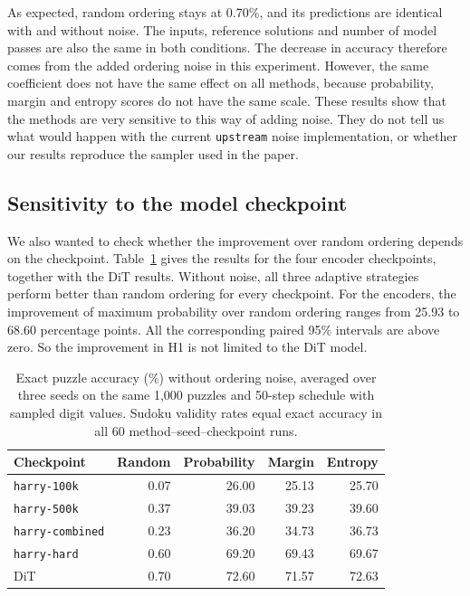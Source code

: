 \documentclass{article}
\begin{document}
As expected, random ordering stays at 0.70\%, and its predictions are
identical with and without noise. The inputs, reference solutions and number
of model passes are also the same in both conditions. The decrease in
accuracy therefore comes from the added ordering noise in this experiment.
However, the same coefficient does not have the same effect on all methods,
because probability, margin and entropy scores do not have the same scale.
These results show that the methods are very sensitive to this way of adding
noise. They do not tell us what would happen with the current
\texttt{upstream} noise implementation, or whether our results reproduce the
sampler used in the paper.

\subsection{Sensitivity to the model checkpoint}
We also wanted to check whether the improvement over random ordering depends
on the checkpoint. Table~\ref{tab:checkpoint-results} gives the results for
the four encoder checkpoints, together with the DiT results. Without noise,
all three adaptive strategies perform better than random ordering for every
checkpoint. For the encoders, the improvement of maximum probability over
random ordering ranges from 25.93 to 68.60 percentage points. All the
corresponding paired 95\% intervals are above zero. So the improvement in H1
is not limited to the DiT model.

\begin{table}[ht]
\centering
\caption{Exact puzzle accuracy (\%) without ordering noise, averaged over
three seeds on the same 1,000 puzzles and 50-step schedule with sampled
digit values. Sudoku validity rates equal exact accuracy in all 60
method--seed--checkpoint runs.}
\label{tab:checkpoint-results}
\begin{tabular}{lrrrr}
\toprule
Checkpoint & Random & Probability & Margin & Entropy \\
\midrule
\texttt{harry-100k}     & 0.07 & 26.00 & 25.13 & 25.70 \\
\texttt{harry-500k}     & 0.37 & 39.03 & 39.23 & 39.60 \\
\texttt{harry-combined} & 0.23 & 36.20 & 34.73 & 36.73 \\
\texttt{harry-hard}     & 0.60 & 69.20 & 69.43 & 69.67 \\
DiT                     & 0.70 & 72.60 & 71.57 & 72.63 \\
\bottomrule
\end{tabular}
\end{table}
\end{document}

